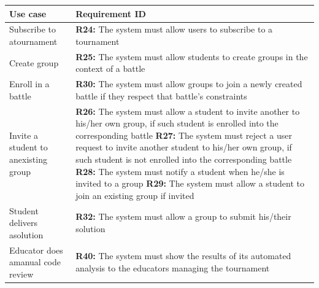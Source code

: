 \documentclass[../RASD.tex]{subfiles}
\begin{document}
    \begin{table}[h!]
        \begin{center}
            \begin{tabular}{|m{10em}|m{30em}|}
            \hline
            \rowcolor{UCMappingFirstRow}
            \textbf{Use case} & \textbf{Requirement ID}\\
            \hline
            Subscribe to a\newline tournament \cellcolor{UCMappingFirstColumn}& \textbf{R24:} The system must allow users to subscribe to a tournament\cellcolor{UCMappingSecondColumn}\\
            \hline
            Create group \cellcolor{UCMappingFirstColumn}& \textbf{R25:} The system must allow students to create groups in the context of a battle\cellcolor{UCMappingSecondColumn}\\
            \hline
            Enroll in a battle \cellcolor{UCMappingFirstColumn}& \textbf{R30:} The system must allow groups to join a newly created battle if they respect that
            battle's constraints\cellcolor{UCMappingSecondColumn}\\
            \hline
            Invite a student to an\newline existing group \cellcolor{UCMappingFirstColumn}& \textbf{R26:} The system must allow a student to invite another to his/her own group, if such student is enrolled into the corresponding battle\cellcolor{UCMappingSecondColumn}\newline
            \textbf{R27:} The system must reject a user request to invite another student to his/her own group, if such student is not enrolled into the corresponding battle\cellcolor{UCMappingSecondColumn}\newline
            \textbf{R28:} The system must notify a student when he/she is invited to a group\cellcolor{UCMappingSecondColumn}\newline
            \textbf{R29:} The system must allow a student to join an existing group if invited\cellcolor{UCMappingSecondColumn}\\
            \hline
            Student delivers a\newline solution \cellcolor{UCMappingFirstColumn} & \textbf{R32:} The system must allow a group to submit his/their solution\cellcolor{UCMappingSecondColumn}\\
            \hline
            Educator does a\newline manual code review \cellcolor{UCMappingFirstColumn}& \textbf{R40:} The system must show the results of its automated analysis to the educators managing the tournament\cellcolor{UCMappingSecondColumn}\newline

\end{tabular}
\end{center}
\end{table}
\end{document}
